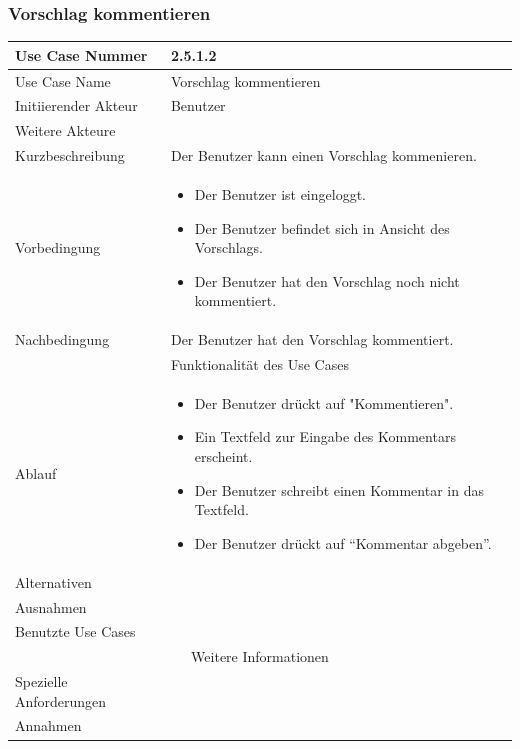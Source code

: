 \documentclass[10pt,a4paper]{article}
\begin{document}
\subsubsection{Vorschlag kommentieren}
	\begin{tabularx}{\textwidth}{|l|X|}
	\hline Use Case Nummer & 2.5.1.2 \\ 
	\hline Use Case Name & Vorschlag kommentieren \\ 
	\hline Initiierender Akteur & Benutzer \\
	\hline Weitere Akteure &  \\
	\hline Kurzbeschreibung & Der Benutzer kann einen Vorschlag kommenieren. \\
	\hline Vorbedingung & \begin{itemize}
        	\item Der Benutzer ist eingeloggt.
                \item Der Benutzer befindet sich in Ansicht des Vorschlags.
                \item Der Benutzer hat den Vorschlag noch nicht kommentiert.
                \end{itemize} \\
	\hline Nachbedingung & Der Benutzer hat den Vorschlag kommentiert. \\
	\hline \multicolumn{2}{|c|}{Funktionalität des Use Cases}\\
	\hline Ablauf & \begin{itemize}
		\item Der Benutzer drückt auf "Kommentieren".
                \item Ein Textfeld zur Eingabe des Kommentars erscheint.
		\item Der Benutzer schreibt einen Kommentar in das Textfeld.
		\item Der Benutzer drückt auf ``Kommentar abgeben''.
	\end{itemize} \\
	\hline Alternativen &  \\
	\hline Ausnahmen &  \\
	\hline Benutzte Use Cases &  \\
	\hline \multicolumn{2}{|c|}{Weitere Informationen} \\
	\hline Spezielle Anforderungen &  \\
	\hline Annahmen &  \\
	\hline
	\end{tabularx}
\end{document}
